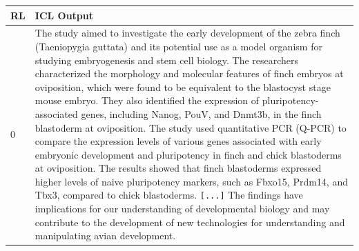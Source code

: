 \begin{table}[]
\centering
\scriptsize
\begin{tabular}{l|p{}}
\textbf{RL} & \textbf{ICL Output} \\ \hline
0 & The study aimed to investigate the early development of the zebra finch (Taeniopygia guttata) and its potential use as a model organism for studying embryogenesis and stem cell biology. The researchers characterized the morphology and molecular features of finch embryos at oviposition, which were found to be equivalent to the blastocyst stage mouse embryo. They also identified the expression of pluripotency-associated genes, including Nanog, PouV, and Dnmt3b, in the finch blastoderm at oviposition.  The study used quantitative PCR (Q-PCR) to compare the expression levels of various genes associated with early embryonic development and pluripotency in finch and chick blastoderms at oviposition. The results showed that finch blastoderms expressed higher levels of naive pluripotency markers, such as Fbxo15, Prdm14, and Tbx3, compared to chick blastoderms. \texttt{[...]}
The findings have implications for our understanding of developmental biology and may contribute to the development of new technologies for understanding and manipulating avian development. \\ \hline

\end{tabular}
\end{table}
